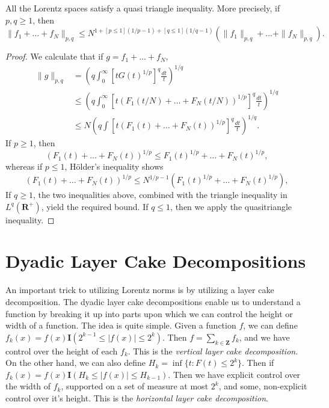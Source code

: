 \begin{theorem}
    All the Lorentz spaces satisfy a quasi triangle inequality. More precisely, if $p,q \geq 1$, then
    \[ \| f_1 + \dots + f_N \|_{p,q} \leq N^{1 + [p \leq 1](1/p - 1) + [q \leq 1](1/q - 1)} \left( \| f_1 \|_{p,q} + \dots + \| f_N \|_{p,q} \right). \]
\end{theorem}
\begin{proof}
    We calculate that if $g = f_1 + \dots + f_N$,
    \begin{align*}
    \| g \|_{p,q} &= \left( q \int_0^\infty \left[t G(t)^{1/p} \right]^q \frac{dt}{t} \right)^{1/q}\\
    &\leq \left( q \int_0^\infty \left[ t (F_1(t/N) + \dots + F_N(t/N))^{1/p} \right]^q \frac{dt}{t} \right)^{1/q}\\
    &\leq N \left( q \int \left[ t \left( F_1(t) + \dots + F_N(t) \right)^{1/p} \right]^q \frac{dt}{t} \right)^{1/q}.
  \end{align*}
  If $p \geq 1$, then
  \[ \left( F_1(t) + \dots + F_N(t) \right)^{1/p} \leq F_1(t)^{1/p} + \dots + F_N(t)^{1/p}, \]
  whereas if $p \leq 1$, H\"{o}lder's inequality shows
  \[ \left( F_1(t) + \dots + F_N(t) \right)^{1/p} \leq N^{1/p - 1} \left( F_1(t)^{1/p} + \dots + F_N(t)^{1/p} \right), \]
  If $q \geq 1$, the two inequalities above, combined with the triangle inequality in $L^q(\mathbf{R}^+)$, yield the required bound. If $q \leq 1$, then we apply the quasitriangle inequality.
\end{proof}

\section{Dyadic Layer Cake Decompositions}

An important trick to utilizing Lorentz norms is by utilizing a layer cake decomposition. The dyadic layer cake decompositions enable us to understand a function by breaking it up into parts upon which we can control the height or width of a function. The idea is quite simple. Given a function $f$, we can define $f_k(x) = f(x) \mathbf{I}(2^{k-1} \leq |f(x)| \leq 2^k)$. Then $f = \sum_{k \in \mathbf{Z}} f_k$, and we have control over the height of each $f_k$. This is the \emph{vertical layer cake decomposition}. On the other hand, we can also define $H_k = \inf \{ t: F(t) \leq 2^k \}$. Then if $f_k(x) = f(x) \mathbf{I}(H_k \leq |f(x)| \leq H_{k-1})$. Then we have explicit control over the width of $f_k$, supported on a set of measure at most $2^k$, and some, non-explicit control over it's height. This is the \emph{horizontal layer cake decomposition}.

